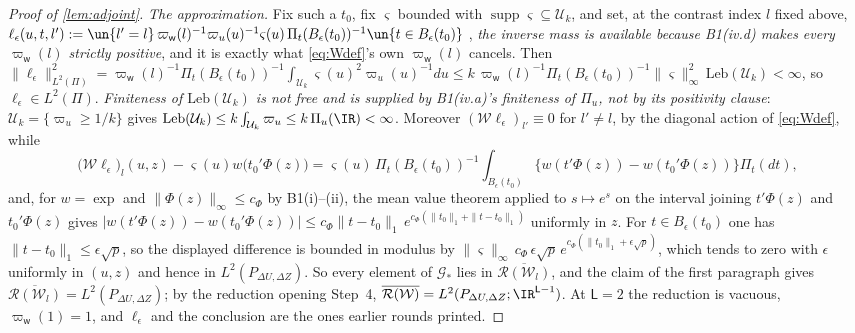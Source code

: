 \begin{proof}[Proof of \cref{lem:adjoint}]
\emph{The approximation.} Fix such a $t_0$, fix $\varsigma$ bounded with
$\operatorname{supp}\varsigma\subseteq\mathcal U_k$, and set, at the contrast index $l$ fixed above,
$\ell_\epsilon(u,t,l'):=\un\{l'=l\}\,\varpi_{\mathsf w}(l)^{-1}\varpi_u(u)^{-1}\varsigma(u)\,\Pi_t(B_\epsilon(t_0))^{-1}\un\{t\in B_\epsilon(t_0)\}$
, \emph{the inverse mass is available because B1(iv.d) makes every $\varpi_{\mathsf w}(l)$ strictly
positive}, and it is exactly what \eqref{eq:Wdef}'s own $\varpi_{\mathsf w}(l)$ cancels.
Then
$\|\ell_\epsilon\|^{2}_{L^{2}(\Pi)}=\varpi_{\mathsf w}(l)^{-1}\Pi_t(B_\epsilon(t_0))^{-1}\int_{\mathcal U_k}\varsigma(u)^{2}\varpi_u(u)^{-1}du
\le k\,\varpi_{\mathsf w}(l)^{-1}\Pi_t(B_\epsilon(t_0))^{-1}\|\varsigma\|_\infty^{2}\,\mathrm{Leb}(\mathcal U_k)<\infty$, so
$\ell_\epsilon\in L^{2}(\Pi)$. \emph{Finiteness of $\mathrm{Leb}(\mathcal U_k)$ is not free and is
supplied by \textup{B1(iv.a)}'s finiteness of $\Pi_u$, not by its positivity clause}:
$\mathcal U_k=\{\varpi_u\ge1/k\}$ gives
$\mathrm{Leb}(\mathcal U_k)\le k\int_{\mathcal U_k}\varpi_u\le k\,\Pi_u(\IR)<\infty$.
Moreover $(\mathcal W\ell_\epsilon)_{l'}\equiv0$ for $l'\ne l$, by the diagonal action of
\eqref{eq:Wdef}, while
\[
\big(\mathcal W\ell_\epsilon\big)_l(u,z)-\varsigma(u)w\big(t_0'\Phi(z)\big)
=\varsigma(u)\,\Pi_t(B_\epsilon(t_0))^{-1}\!\!\int_{B_\epsilon(t_0)}\!\!\big\{w(t'\Phi(z))-w(t_0'\Phi(z))\big\}\Pi_t(dt),
\]
and, for $w=\exp$ and $\|\Phi(z)\|_\infty\le c_\Phi$ by B1(i)--(ii), the mean value theorem applied to
$s\mapsto e^{s}$ on the interval joining $t'\Phi(z)$ and $t_0'\Phi(z)$ gives
$|w(t'\Phi(z))-w(t_0'\Phi(z))|\le c_\Phi\|t-t_0\|_1\,e^{c_\Phi(\|t_0\|_1+\|t-t_0\|_1)}$ uniformly in $z$.
For $t\in B_\epsilon(t_0)$ one has $\|t-t_0\|_1\le\epsilon\sqrt p$, so the displayed difference is
bounded in modulus by
$\|\varsigma\|_\infty\,c_\Phi\,\epsilon\sqrt p\,e^{c_\Phi(\|t_0\|_1+\epsilon\sqrt p)}$, which tends to
zero with $\epsilon$ uniformly in $(u,z)$ and hence in $L^{2}(P_{\Delta U,\Delta Z})$. So every element
of $\mathcal G_\ast$ lies in $\overline{\mathcal R(\mathcal W_l)}$, and the claim of the first paragraph
gives $\overline{\mathcal R(\mathcal W_l)}=L^{2}(P_{\Delta U,\Delta Z})$; by the reduction opening
Step~4, $\overline{\mathcal R(\mathcal W)}=L^{2}(P_{\Delta U,\Delta Z};\IR^{\mathsf L-1})$.
At $\mathsf L=2$ the reduction is vacuous, $\varpi_{\mathsf w}(1)=1$, and $\ell_\epsilon$ and the
conclusion are the ones earlier rounds printed.
\end{proof}

